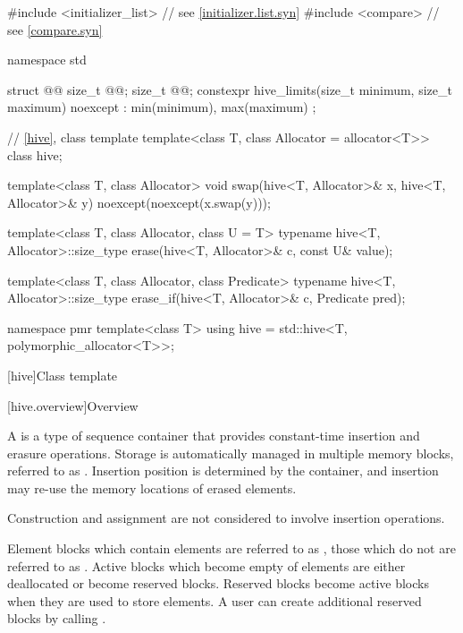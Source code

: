 %
\begin{codeblock}
#include <initializer_list>     // see \ref{initializer.list.syn}
#include <compare>              // see \ref{compare.syn}

namespace std {
  struct @@ {
    size_t @@;
    size_t @@;
    constexpr hive_limits(size_t minimum, size_t maximum) noexcept
      : min(minimum), max(maximum) {}
  };

  // \ref {hive}, class template 
  template<class T, class Allocator = allocator<T>> class hive;

  template<class T, class Allocator>
    void swap(hive<T, Allocator>& x, hive<T, Allocator>& y)
      noexcept(noexcept(x.swap(y)));

  template<class T, class Allocator, class U = T>
    typename hive<T, Allocator>::size_type
      erase(hive<T, Allocator>& c, const U& value);

  template<class T, class Allocator, class Predicate>
    typename hive<T, Allocator>::size_type
      erase_if(hive<T, Allocator>& c, Predicate pred);

  namespace pmr {
    template<class T>
      using hive = std::hive<T, polymorphic_allocator<T>>;
  }
}
\end{codeblock}

[hive]{Class template }

[hive.overview]{Overview}

\pnum
A  is a type of sequence container
that provides constant-time insertion and erasure operations.
Storage is automatically managed in multiple memory blocks,
referred to as .
Insertion position is determined by the container, and insertion
may re-use the memory locations of erased elements.
\begin{note}
Construction and assignment are not considered to involve insertion operations.
\end{note}

\pnum
Element blocks which contain elements are referred to
as ,
those which do not are referred to as .
Active blocks which become empty of elements are
either deallocated or become reserved blocks.
Reserved blocks become active blocks when they are used to store elements.
A user can create additional reserved blocks by calling .

